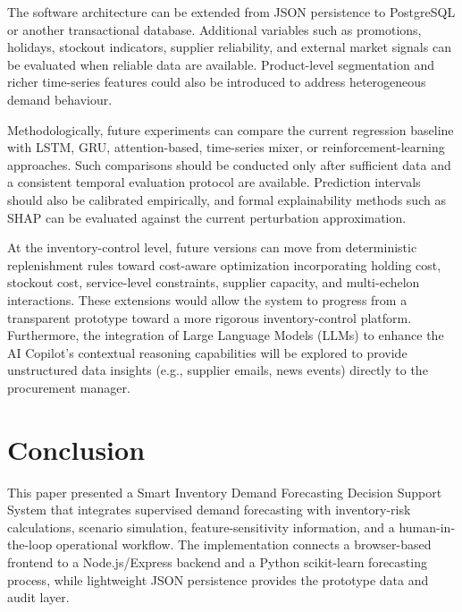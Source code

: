 \documentclass[9pt,conference]{IEEEtran}
\providecommand{\syscite}[1]{}
\begin{document}
The software architecture can be extended from JSON persistence to PostgreSQL or another transactional database. \syscite{[cite: 1]} Additional variables such as promotions, holidays, stockout indicators, supplier reliability, and external market signals can be evaluated when reliable data are available. \syscite{[cite: 1]} Product-level segmentation and richer time-series features could also be introduced to address heterogeneous demand behaviour. \syscite{[cite: 1]}

Methodologically, future experiments can compare the current regression baseline with LSTM, GRU, attention-based, time-series mixer, or reinforcement-learning approaches. \syscite{[cite: 1]} Such comparisons should be conducted only after sufficient data and a consistent temporal evaluation protocol are available. \syscite{[cite: 1]} Prediction intervals should also be calibrated empirically, and formal explainability methods such as SHAP can be evaluated against the current perturbation approximation. \syscite{[cite: 1]}

At the inventory-control level, future versions can move from deterministic replenishment rules toward cost-aware optimization incorporating holding cost, stockout cost, service-level constraints, supplier capacity, and multi-echelon interactions. \syscite{[cite: 1]} These extensions would allow the system to progress from a transparent prototype toward a more rigorous inventory-control platform. \syscite{[cite: 1]} Furthermore, the integration of Large Language Models (LLMs) to enhance the AI Copilot's contextual reasoning capabilities will be explored to provide unstructured data insights (e.g., supplier emails, news events) directly to the procurement manager.

\section{Conclusion}
This paper presented a Smart Inventory Demand Forecasting Decision Support System that integrates supervised demand forecasting with inventory-risk calculations, scenario simulation, feature-sensitivity information, and a human-in-the-loop operational workflow. \syscite{[cite: 1]} The implementation connects a browser-based frontend to a Node.js/Express backend and a Python scikit-learn forecasting process, while lightweight JSON persistence provides the prototype data and audit layer. \syscite{[cite: 1]} 
\end{document}
